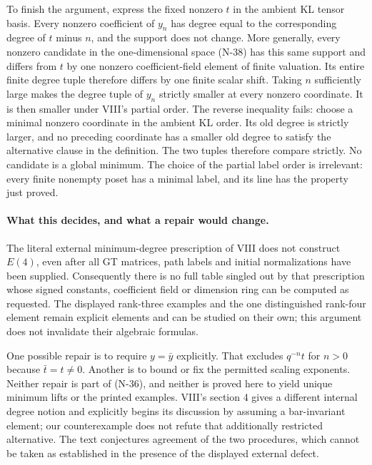 To finish the argument, express the fixed nonzero $t$ in the ambient
KL tensor basis.  Every nonzero coefficient of $y_n$ has degree
equal to the corresponding degree of $t$ minus $n$, and the support
does not change.  More generally, every nonzero candidate in the
one-dimensional space (N-38) has this same support and differs from
$t$ by one nonzero coefficient-field element of finite valuation.  Its entire finite degree
tuple therefore differs by one finite scalar shift.  Taking $n$
sufficiently large makes the degree tuple of $y_n$ strictly smaller
at every nonzero coordinate.  It is then smaller under VIII's
partial order.  The reverse inequality fails: choose a minimal
nonzero coordinate in the ambient KL order.  Its old degree is
strictly larger, and no preceding coordinate has a smaller old
degree to satisfy the alternative clause in the definition.
The two tuples therefore compare strictly.  No candidate is a
global minimum.  The choice of the partial label order is irrelevant:
every finite nonempty poset has a minimal label, and its line has
the property just proved.

\paragraph{What this decides, and what a repair would change.}
The literal external minimum-degree prescription of VIII does not
construct $E(4)$, even after all GT matrices, path labels and initial
normalizations have been supplied.  Consequently there is no full
table singled out by that prescription whose signed constants,
coefficient field or dimension ring can be computed as requested.
The displayed rank-three examples and the one distinguished
rank-four element remain explicit elements and can be studied on
their own; this argument does not invalidate their algebraic formulas.

One possible repair is to require $y=\bar y$ explicitly.  That
excludes $q^{-n}t$ for $n>0$ because $\bar t=t\ne0$.  Another is
to bound or fix the permitted scaling exponents.  Neither repair
is part of (N-36), and neither is proved here to yield unique
minimum lifts or the printed examples.  VIII's section 4 gives a
different internal degree notion and explicitly begins its
discussion by assuming a bar-invariant element; our counterexample
does not refute that additionally restricted alternative.  The
text conjectures agreement of the two procedures, which cannot be
taken as established in the presence of the displayed external
defect.

